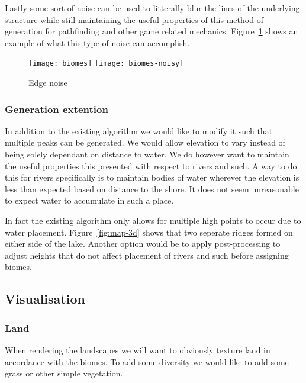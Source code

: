 Lastly some sort of noise can be used to litterally blur the lines of the underlying structure while still maintaining the useful properties of this method of generation for pathfinding and other game related mechanics. Figure~\ref{fig:biomes} shows an example of what this type of noise can accomplish.

\newlength{\imagewidth}

\begin{figure}[H]
	\centering
	\texttt{[image: biomes]}
	\texttt{[image: biomes-noisy]}
	\caption{Edge noise}
	\label{fig:biomes}
\end{figure}

\subsubsection{Generation extention}

In addition to the existing algorithm we would like to modify it such that multiple peaks can be generated. We would allow elevation to vary instead of being solely dependant on distance to water. We do however want to maintain the useful properties this presented with respect to rivers and such. A way to do this for rivers specifically is to maintain bodies of water wherever the elevation is less than expected based on distance to the shore. It does not seem unreasonable to expect water to accumulate in such a place. 

In fact the existing algorithm only allows for multiple high points to occur due to water placement. Figure~\ref{fig:map-3d} shows that two seperate ridges formed on either side of the lake. Another option would be to apply post-processing to adjust heights that do not affect placement of rivers and such before assigning biomes.

\subsection{Visualisation}

\subsubsection{Land}

When rendering the landscapes we will want to obviously texture land in accordance with the biomes. To add some diversity we would like to add some grass or other simple vegetation.

